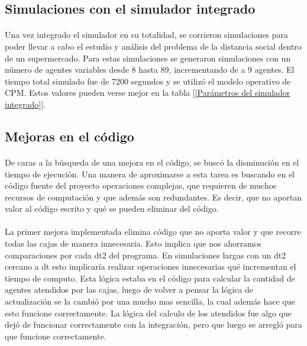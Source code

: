 \documentclass{article}
\begin{document}
\subsection{Simulaciones con el simulador integrado}

\paragraph{}
Una vez integrado el simulador en su totalidad, se corrieron simulaciones para poder llevar a cabo el estudio y análisis del problema de la distancia social dentro de un supermercado. Para estas simulaciones se generaron simulaciones con un número de agentes variables desde 8 hasta 89, incrementando de a 9 agentes. El tiempo total simulado fue de 7200 segundos y se utilizó el modelo operativo de CPM.  Estos valores pueden verse mejor en la tabla [\ref{Parámetros del simulador integrado}].

\subsection{Mejoras en el código}

\paragraph{}
De caras a la búsqueda de una mejora en el código, se buscó la disminución en el tiempo de ejecución. Una manera de aproximarse a esta tarea es buscando en el código fuente del proyecto operaciones complejas, que requieren de muchos recursos de computación y que además son redundantes. Es decir, que no aportan valor al código escrito y qué se pueden eliminar del código.

\paragraph{}
La primer mejora implementada elimina código que no aporta valor y que recorre todas las cajas de manera innecesaria. Esto implica que nos ahorramos comparaciones por cada dt2 del programa. En simulaciones largas con un dt2 cercano a dt esto implicaría realizar operaciones innecesarias qué incrementan el tiempo de computo. Esta lógica estaba en el código para calcular la cantidad de agentes atendidos por las cajas, luego de volver a pensar la lógica de actualización se la cambió por una mucho mas sencilla, la cual además hace que esto funcione correctamente. La lógica del calculo de los atendidos fue algo que dejó de funcionar correctamente con la integración, pero que luego se arregló para que funcione correctamente.
\end{document}
